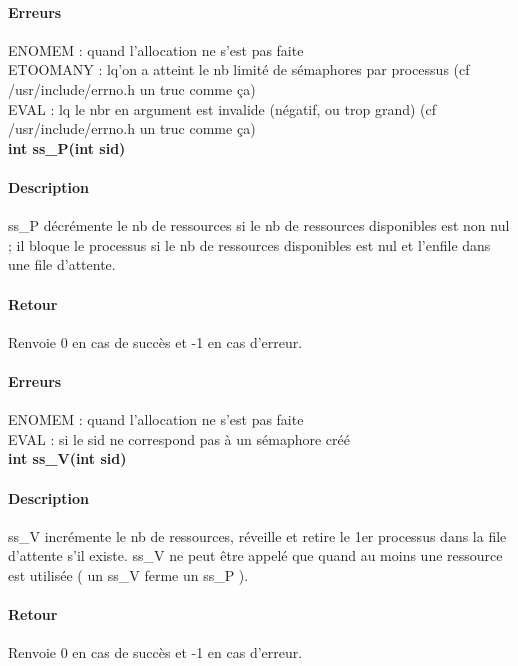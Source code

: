 \documentclass[12pt]{article}
\begin{document}
      \paragraph{Erreurs\\}
      ENOMEM : quand l'allocation ne s'est pas faite \\
      ETOOMANY : lq'on a atteint le nb limité de sémaphores par processus (cf /usr/include/errno.h un truc comme ça) \\
      EVAL : lq le nbr en argument est invalide (négatif, ou trop grand) (cf /usr/include/errno.h un truc comme ça) \\

      \newpage
      \textbf{int ss_P(int sid)} \\
      \paragraph{Description\\}
      ss_P décrémente le nb de ressources si le nb de ressources disponibles est non nul ; il bloque le processus si le nb de ressources disponibles est nul et l'enfile dans une file d'attente.
      \paragraph{Retour\\}
      Renvoie 0 en cas de succès et -1 en cas d'erreur.
      \paragraph{Erreurs\\}
      ENOMEM : quand l'allocation ne s'est pas faite \\
      EVAL : si le sid ne correspond pas à un sémaphore créé \\

      \newpage
      \textbf{int ss_V(int sid)} \\
      \paragraph{Description\\}
      ss_V incrémente le nb de ressources, réveille et retire le 1er processus dans la file d'attente s'il existe. ss_V ne peut être appelé que quand au moins une ressource est utilisée ( un ss_V ferme un ss_P ).
      \paragraph{Retour\\}
      Renvoie 0 en cas de succès et -1 en cas d'erreur.
\end{document}
